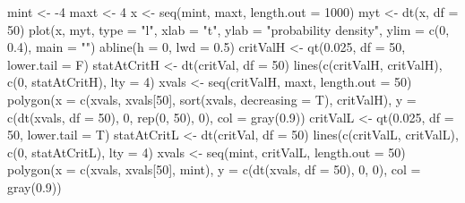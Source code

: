 \begin{Schunk}
\begin{Sinput}
 mint <- -4
 maxt <- 4
 x <- seq(mint, maxt, length.out = 1000)
 myt <- dt(x, df = 50)
 plot(x, myt, type = "l", xlab = "t", ylab = "probability density", ylim = c(0, 
      0.4), main = "")
 abline(h = 0, lwd = 0.5)
 critValH <- qt(0.025, df = 50, lower.tail = F)
 statAtCritH <- dt(critVal, df = 50)
 lines(c(critValH, critValH), c(0, statAtCritH), lty = 4)
 xvals <- seq(critValH, maxt, length.out = 50)
 polygon(x = c(xvals, xvals[50], sort(xvals, decreasing = T), critValH), y = c(dt(xvals, 
      df = 50), 0, rep(0, 50), 0), col = gray(0.9))
 critValL <- qt(0.025, df = 50, lower.tail = T)
 statAtCritL <- dt(critVal, df = 50)
 lines(c(critValL, critValL), c(0, statAtCritL), lty = 4)
 xvals <- seq(mint, critValL, length.out = 50)
 polygon(x = c(xvals, xvals[50], mint), y = c(dt(xvals, df = 50), 0, 0), col = gray(0.9))
\end{Sinput}
\end{Schunk}
